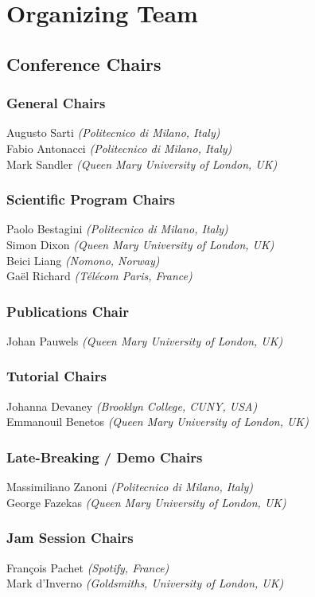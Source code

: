 \section*{Organizing Team}

\subsection*{Conference Chairs}

\subsubsection*{General Chairs}
Augusto Sarti \emph{(Politecnico di Milano, Italy)}\\
Fabio Antonacci \emph{(Politecnico di Milano, Italy)}\\
Mark Sandler \emph{(Queen Mary University of London, UK)}

\subsubsection*{Scientific Program Chairs}
Paolo Bestagini \emph{(Politecnico di Milano, Italy)}\\
Simon Dixon \emph{(Queen Mary University of London, UK)}\\
Beici Liang \emph{(Nomono, Norway)}\\
Gaël Richard \emph{(Télécom Paris, France)}

\subsubsection*{Publications Chair}
Johan Pauwels \emph{(Queen Mary University of London, UK)}

\subsubsection*{Tutorial Chairs}	 
Johanna Devaney \emph{(Brooklyn College, CUNY, USA)}\\
Emmanouil Benetos \emph{(Queen Mary University of London, UK)}

\subsubsection*{Late-Breaking / Demo Chairs}
Massimiliano Zanoni \emph{(Politecnico di Milano, Italy)}\\
George Fazekas \emph{(Queen Mary University of London, UK)}

\subsubsection*{Jam Session Chairs}
François Pachet \emph{(Spotify, France)}\\
Mark d’Inverno \emph{(Goldsmiths, University of London, UK)}

